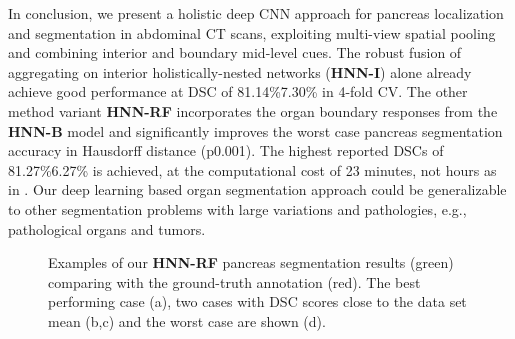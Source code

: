 \documentclass[journal]{IEEEtran}
\begin{document}
In conclusion, we present a holistic deep CNN approach for pancreas localization and segmentation in abdominal CT scans, exploiting multi-view spatial pooling and combining interior and boundary mid-level cues. The robust fusion of  aggregating on interior holistically-nested networks ({\bf HNN-I}) alone already achieve good performance at DSC of 81.14\%7.30\% in 4-fold CV. The other method variant \textbf{HNN-RF} incorporates the organ boundary responses from the {\bf HNN-B} model and significantly improves the worst case pancreas segmentation accuracy in Hausdorff distance (p0.001). The highest reported DSCs of 81.27\%6.27\% is achieved, at the computational cost of 23 minutes, not hours as in \cite{Wang2014Miccai,Chu2013Miccai,wolz2013automated}. Our deep learning based organ segmentation approach could be generalizable to other segmentation problems with large variations and pathologies, e.g., pathological organs and tumors.
\begin{figure*}[htb]\centering	{}
	\caption{\small Examples of our \textbf{HNN-RF} pancreas segmentation results (green) comparing with the ground-truth annotation (red). The best performing case (a), two cases with DSC scores close to the data set mean (b,c) and the worst case are shown (d).}
	\label{fig:axial_examples}
\end{figure*}
  
\end{document}
